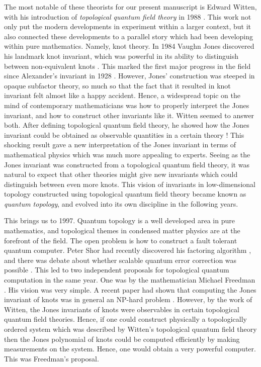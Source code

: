\documentclass{article}
\theoremstyle{definition}
\numberwithin{figure}{section}
\begin{document}
The most notable of these theorists for our present manuscript is Edward Witten, with his introduction of \textit{topological quantum field theory} in 1988 \cite{witten1988topological}. This work not only put the modern developments in experiment within a larger context, but it also connected these developments to a parallel story which had been developing within pure mathematics. Namely, knot theory. In 1984 Vaughn Jones discovered his landmark knot invariant, which was powerful in its ability to distinguish between non-equivalent knots \cite{jones1997polynomial}. This marked the first major progress in the field since Alexander's invariant in 1928 \cite{alexander1928topological}. However, Jones’ construction was steeped in opaque subfactor theory, so much so that the fact that it resulted in knot invariant felt almost like a happy accident. Hence, a widespread topic on the mind of contemporary mathematicians was how to properly interpret the Jones invariant, and how to construct other invariants like it. Witten seemed to answer both. After defining topological quantum field theory, he showed how the Jones invariant could be obtained as observable quantities in a certain theory \cite{witten1989quantum}! This shocking result gave a new interpretation of the Jones invariant in terms of mathematical physics which was much more appealing to experts. Seeing as the Jones invariant was constructed from a topological quantum field theory, it was natural to expect that other theories might give new invariants which could distinguish between even more knots. This vision of invariants in low-dimensional topology constructed using topological quantum field theory became known as \textit{quantum topology}, and evolved into its own discipline in the following years.

This brings us to 1997. Quantum topology is a well developed area in pure mathematics, and topological themes in condensed matter physics are at the forefront of the field. The open problem is how to construct a fault tolerant quantum computer. Peter Shor had recently discovered his factoring algorithm \cite{shor1994algorithms}, and there was debate about whether scalable quantum error correction was possible \cite{landauer1995quantum}. This led to two independent proposals for topological quantum computation in the same year. One was by the mathematician Michael Freedman \cite{freedman1998p}. His vision was very simple. A recent paper had shown that computing the Jones invariant of knots was in general an NP-hard problem \cite{jaeger1990computational}. However, by the work of Witten, the Jones invariants of knots were observables in certain topological quantum field theories. Hence, if one could construct physically a topologically ordered system which was described by Witten’s topological quantum field theory then the Jones polynomial of knots could be computed efficiently by making measurements on the system. Hence, one would obtain a very powerful computer. This was Freedman’s proposal.
\end{document}
